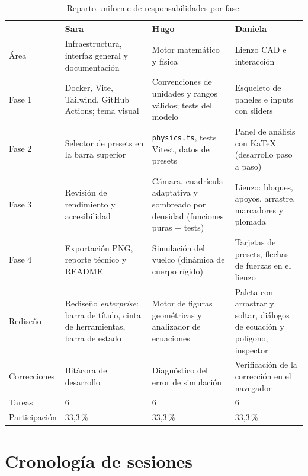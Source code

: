 \documentclass[11pt,a4paper]{article}
\newcommand{\miembro}[1]{\textbf{\sffamily #1}}
\begin{document}
\begin{table}[h]
\centering
\small
\begin{tabularx}{\textwidth}{L{2.2cm}YYY}
\toprule
 & \miembro{Sara} & \miembro{Hugo} & \miembro{Daniela}\\
\midrule
Área & Infraestructura, interfaz general y documentación & Motor matemático y física & Lienzo CAD e interacción\\
\midrule
Fase 1 & Docker, Vite, Tailwind, GitHub Actions; tema visual & Convenciones de unidades y rangos válidos; tests del modelo & Esqueleto de paneles e inputs con sliders\\
Fase 2 & Selector de presets en la barra superior & \texttt{physics.ts}, tests Vitest, datos de presets & Panel de análisis con KaTeX (desarrollo paso a paso)\\
Fase 3 & Revisión de rendimiento y accesibilidad & Cámara, cuadrícula adaptativa y sombreado por densidad (funciones puras + tests) & Lienzo: bloques, apoyos, arrastre, marcadores y plomada\\
Fase 4 & Exportación PNG, reporte técnico y README & Simulación del vuelco (dinámica de cuerpo rígido) & Tarjetas de presets, flechas de fuerzas en el lienzo\\
Rediseño & Rediseño \emph{enterprise}: barra de título, cinta de herramientas, barra de estado & Motor de figuras geométricas y analizador de ecuaciones & Paleta con arrastrar y soltar, diálogos de ecuación y polígono, inspector\\
Correcciones & Bitácora de desarrollo & Diagnóstico del error de simulación & Verificación de la corrección en el navegador\\
\midrule
Tareas & 6 & 6 & 6\\
Participación & 33,3\,\% & 33,3\,\% & 33,3\,\%\\
\bottomrule
\end{tabularx}
\caption{Reparto uniforme de responsabilidades por fase.}
\end{table}

\section{Cronología de sesiones}
\end{document}

